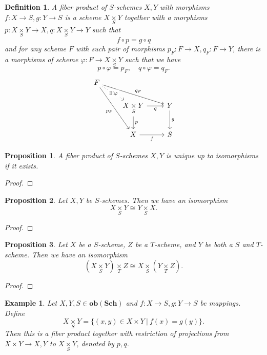 \documentclass{article}
\newtheorem{proposition}{Proposition}[section]
\newtheorem{definition}{Definition}[section]
\newtheorem{example}{Example}[section]
\numberwithin{equation}{section}
\newcommand{\fib}[1]{%
  \mathbin{\mathop{\times}\limits_{#1}}%
}
\begin{document}
\begin{definition}
A fiber product of $S$-schemes $X,Y$ with morphisms $f:X\to S,g:Y\to S$ is a scheme $X\fib{S}Y$ together with a morphisms $p:X\fib{S}Y\to X,q:X\fib{S}Y\to Y$ such that
\begin{equation*}
f\circ p = g\circ q
\end{equation*}
and for any scheme $F$ with such pair of morphisms $p_F:F\to X,q_F:F\to Y$, there is a morphisms of scheme $\varphi:F\to X\fib{S}Y$ such that we have
\begin{equation*}
p\circ\varphi=p_F,\quad q\circ\varphi = q_F.
\end{equation*}
\[
\begin{tikzcd}
F \arrow[rrd, "q_F"] \arrow[rdd, "p_F"'] \arrow[rd, "\exists !\varphi" description, dotted] &                                           &                  \\
                                                                                     & X\fib{S} Y \arrow[d, "p"] \arrow[r, "q"'] & Y \arrow[d, "g"] \\
                                                                                     & X \arrow[r, "f"']                         & S               
\end{tikzcd}
\]
\end{definition}

\begin{proposition}
A fiber product of $S$-schemes $X,Y$ is unique up to isomorphisms if it exists.
\end{proposition}
\begin{proof}
\end{proof}
\begin{proposition}
Let $X,Y$ be $S$-schemes. Then we have an isomorphism
\begin{equation*}
X\fib{S}Y\cong Y\fib{S}X.
\end{equation*}
\end{proposition}
\begin{proof}
\end{proof}
\begin{proposition}
Let $X$ be a $S$-scheme, $Z$ be a $T$-scheme, and $Y$ be both a $S$ and $T$-scheme. Then we have an isomorphism
\begin{equation*}
(X\fib{S}Y)\fib{T}Z \cong X\fib{S}(Y\fib{T}Z).
\end{equation*}
\end{proposition}
\begin{proof}
\end{proof}
\begin{example}
Let $X,Y,S\in \mathbf{ob}(\mathbf{Sch})$ and $f:X\to S, g:Y\to S$ be mappings. Define
\begin{equation*}
X\fib{S}Y = \{(x,y)\in X\times Y\:|\: f(x) = g(y)\}.
\end{equation*}
Then this is a fiber product together with restriction of projections from $X\times Y\to X,Y$ to $X\fib{S} Y$, denoted by $p,q$. 
\end{example}
\end{document}
